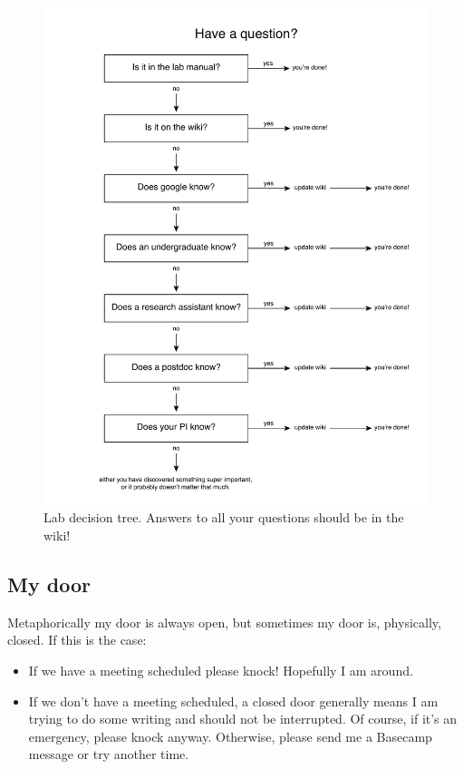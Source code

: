 \documentclass[letterpaper,12pt,oneside]{memoir}
\begin{document}
\begin{figure}
\label{fig:decisiontree}
\includegraphics[width=\textwidth]{figures/lab_decision_tree.pdf}
\caption{Lab decision tree. Answers to all your questions should be in the wiki!}
\end{figure}

\subsection{My door}
Metaphorically my door is always open, but sometimes my door is, physically, closed. If this is the case:

\begin{itemize}
\item If we have a meeting scheduled please knock! Hopefully I am around.

\item If we don't have a meeting scheduled, a closed door generally means I am trying to do some writing and should not be interrupted. Of course, if it's an emergency, please knock anyway. Otherwise, please send me a Basecamp message or try another time.
\end{itemize}
\end{document}
